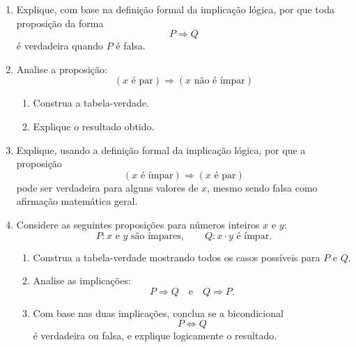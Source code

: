 \documentclass[12pt]{article}
\begin{document}
\begin{enumerate}
\item Explique, com base na definição formal da implicação lógica,
por que toda proposição da forma
\[
P \Rightarrow Q
\]
é verdadeira quando $P$ é falsa.

\item Analise a proposição:
\[
(x \text{ é par}) \Rightarrow (x \text{ não é ímpar})
\]
\begin{enumerate}
    \item Construa a tabela-verdade.
    \item Explique o resultado obtido.
\end{enumerate}

\item Explique, usando a definição formal da implicação lógica,
por que a proposição
\[
(x \text{ é ímpar}) \Rightarrow (x \text{ é par})
\]
pode ser verdadeira para alguns valores de $x$,
mesmo sendo falsa como afirmação matemática geral.


  
\item Considere as seguintes proposições para números inteiros \(x\) e \(y\):
\[
P: x \text{ e } y \text{ são ímpares}, \qquad Q: x \cdot y \text{ é ímpar}.
\]
\begin{enumerate}
    \item Construa a tabela-verdade mostrando todos os casos possíveis para \(P\) e \(Q\).
    \item Analise as implicações:
    \[
    P \Rightarrow Q \quad \text{e} \quad Q \Rightarrow P.
    \]
    \item Com base nas duas implicações, conclua se a bicondicional
    \[
    P \Leftrightarrow Q
    \]
    é verdadeira ou falsa, e explique logicamente o resultado.
\end{enumerate}

\end{enumerate}


\end{document}
